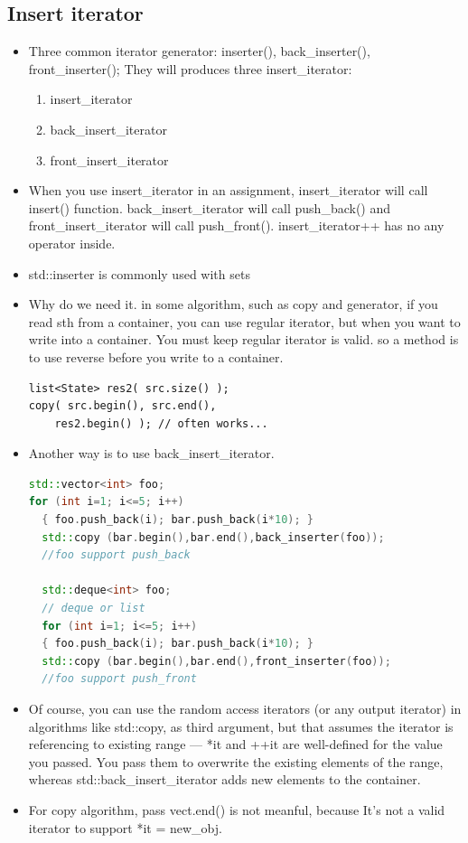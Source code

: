 \documentclass[a4paper,11pt,twoside]{book}
\begin{document}
\subsection{Insert iterator}
\begin{itemize}
\item Three common iterator generator: inserter(), back\_inserter(), front\_inserter();  They will produces three insert\_iterator:
\begin{enumerate}
	\item insert\_iterator
	\item back\_insert\_iterator
	\item front\_insert\_iterator
\end{enumerate}

\item When you use insert\_iterator in an assignment, insert\_iterator will call insert() function.  \newline 
back\_insert\_iterator will call push\_back() and front\_insert\_iterator will call push\_front(). insert\_iterator++ has no any operator inside.

\item  std::inserter is commonly used with sets

\item Why do we need it. in some algorithm, such as copy and generator, if you read sth from a container, you can use regular iterator, but when you want to write into a container.  You must keep regular iterator is valid. so a method is to use reverse before you write to a container.

\begin{lstlisting}[numbers=none]
list<State> res2( src.size() );
copy( src.begin(), src.end(),
    res2.begin() ); // often works...
\end{lstlisting}

\item Another way is to use back\_insert\_iterator.
\begin{lstlisting}[frame=single, language=c++]
std::vector<int> foo;
for (int i=1; i<=5; i++)
  { foo.push_back(i); bar.push_back(i*10); }
  std::copy (bar.begin(),bar.end(),back_inserter(foo));
  //foo support push_back

  std::deque<int> foo;
  // deque or list
  for (int i=1; i<=5; i++)
  { foo.push_back(i); bar.push_back(i*10); }
  std::copy (bar.begin(),bar.end(),front_inserter(foo));
  //foo support push_front
\end{lstlisting}

\item Of course, you can use the random access iterators (or any output iterator) in algorithms like std::copy, as third argument, but that assumes the iterator is referencing to existing range — *it and ++it are well-defined for the value you passed. You pass them to overwrite the existing elements of the range, whereas std::back\_insert\_iterator adds new elements to the container.

\item For copy algorithm, pass vect.end() is not meanful, because It's not a valid iterator to support *it = new\_obj.

\end{itemize}
\end{document}
